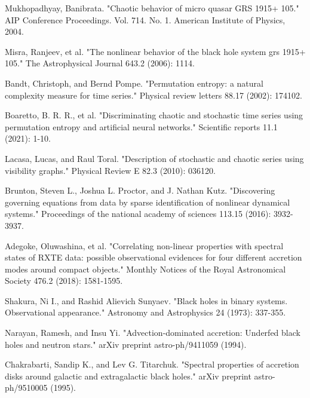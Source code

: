 \documentclass[10pt,conference]{IEEEtran}
\begin{document}
\begin{thebibliography}{1}
 Mukhopadhyay, Banibrata. "Chaotic behavior of micro quasar GRS 1915+ 105." AIP Conference Proceedings. Vol. 714. No. 1. American Institute of Physics, 2004.

Misra, Ranjeev, et al. "The nonlinear behavior of the black hole system grs 1915+ 105." The Astrophysical Journal 643.2 (2006): 1114.

Bandt, Christoph, and Bernd Pompe. "Permutation entropy: a natural complexity measure for time series." Physical review letters 88.17 (2002): 174102.

Boaretto, B. R. R., et al. "Discriminating chaotic and stochastic time series using permutation entropy and artificial neural networks." Scientific reports 11.1 (2021): 1-10.

  Lacasa, Lucas, and Raul Toral. "Description of stochastic and chaotic series using visibility graphs." Physical Review E 82.3 (2010): 036120.

  Brunton, Steven L., Joshua L. Proctor, and J. Nathan Kutz. "Discovering governing equations from data by sparse identification of nonlinear dynamical systems." Proceedings of the national academy of sciences 113.15 (2016): 3932-3937.

Adegoke, Oluwashina, et al. "Correlating non-linear properties with spectral states of RXTE data: possible observational evidences for four different accretion modes around compact objects." Monthly Notices of the Royal Astronomical Society 476.2 (2018): 1581-1595.

Shakura, Ni I., and Rashid Alievich Sunyaev. "Black holes in binary systems. Observational appearance." Astronomy and Astrophysics 24 (1973): 337-355.

  Narayan, Ramesh, and Insu Yi. "Advection-dominated accretion: Underfed black holes and neutron stars." arXiv preprint astro-ph/9411059 (1994).

Chakrabarti, Sandip K., and Lev G. Titarchuk. "Spectral properties of accretion disks around galactic and extragalactic black holes." arXiv preprint astro-ph/9510005 (1995).

\end{thebibliography}

\end{document}
